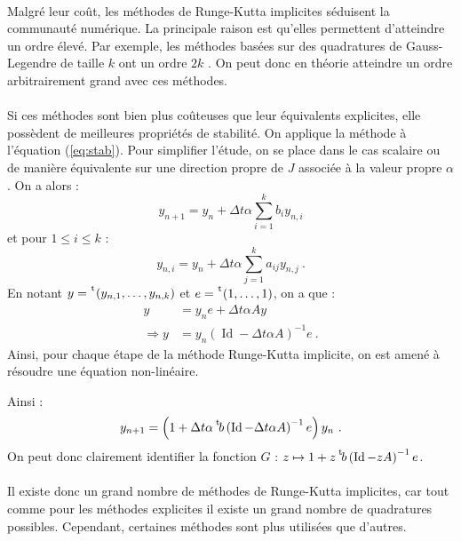     \paragraph{}
    Malgré leur coût, les méthodes de Runge-Kutta implicites séduisent la communauté numérique.
    La principale raison est qu'elles permettent d'atteindre un ordre élevé.
    Par exemple, les méthodes basées sur des quadratures de Gauss-Legendre de taille $k$ ont un ordre $2k$ \cite{Iserles2008}.
    On peut donc en théorie atteindre un ordre arbitrairement grand avec ces méthodes.

    \paragraph{}
    Si ces méthodes sont bien plus coûteuses que leur équivalents explicites, elle possèdent de meilleures propriétés de stabilité.
    On applique la méthode à l'équation (\ref{eq:stab}).
    Pour simplifier l'étude, on se place dans le cas scalaire ou de manière équivalente sur une direction propre de $J$ associée à la valeur propre $\alpha$.
    On a alors :
    \[y_{n+1} = y_n + \Delta t\alpha \sum_{i = 1}^k b_iy_{n,i}\]
    et pour $1\leq i\leq k$ :
    \[y_{n,i} = y_n + \Delta t\alpha \sum_{j = 1}^k a_{ij}y_{n,j}\ .\]
    En notant $y = \mskip1mu\prescript{\smash{\mathrm t\mkern-3mu}}{}{\mathstrut\left(y_{n,1}, \dots, y_{n,k}\right)}$ et $e = \mskip1mu\prescript{\smash{\mathrm t\mkern-3mu}}{}{\mathstrut\left(1, \dots, 1\right)}$, on a que :
    \begin{align*}
      y &= y_ne + \Delta t\alpha Ay \\
      \Rightarrow y &= y_n\left(\operatorname{Id} - \Delta t\alpha A\right)^{-1}e\ .
    \end{align*}    Ainsi, pour chaque étape de la méthode Runge-Kutta implicite, on est amené à résoudre une équation non-linéaire.

    Ainsi :
    \[y_{n+1} = \left(1 + \Delta t\alpha\mskip1mu\prescript{\smash{\mathrm t\mkern-3mu}}{}{\mathstrut b}\left(\operatorname{Id} - \Delta t\alpha A\right)^{-1}e\right)y_n\ .\]
    On peut donc clairement identifier la fonction $G$ : $z \mapsto 1 + z\mskip1mu\prescript{\smash{\mathrm t\mkern-3mu}}{}{\mathstrut b}\left(\operatorname{Id} - zA\right)^{-1}e$.

    \paragraph{}
    Il existe donc un grand nombre de méthodes de Runge-Kutta implicites, car tout comme pour les méthodes explicites il existe un grand nombre de quadratures possibles.
    Cependant, certaines méthodes sont plus utilisées que d'autres.

